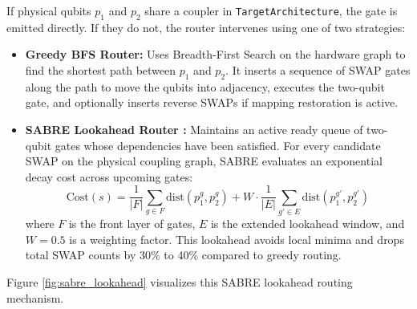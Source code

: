 If physical qubits $p_1$ and $p_2$ share a coupler in \texttt{TargetArchitecture}, the gate is emitted directly. If they do not, the router intervenes using one of two strategies:
\begin{itemize}[leftmargin=*]
    \item \textbf{Greedy BFS Router:} Uses Breadth-First Search on the hardware graph to find the shortest path between $p_1$ and $p_2$. It inserts a sequence of SWAP gates along the path to move the qubits into adjacency, executes the two-qubit gate, and optionally inserts reverse SWAPs if mapping restoration is active.
    \item \textbf{SABRE Lookahead Router \cite{li2019sabre}:} Maintains an active ready queue of two-qubit gates whose dependencies have been satisfied. For every candidate SWAP on the physical coupling graph, SABRE evaluates an exponential decay cost across upcoming gates:
    \begin{equation}
    \text{Cost}(s) = \frac{1}{|F|} \sum_{g \in F} \text{dist}(p_1^g, p_2^g) + W \cdot \frac{1}{|E|} \sum_{g' \in E} \text{dist}(p_1^{g'}, p_2^{g'})
    \end{equation}
    where $F$ is the front layer of gates, $E$ is the extended lookahead window, and $W = 0.5$ is a weighting factor. This lookahead avoids local minima and drops total SWAP counts by 30\% to 40\% compared to greedy routing.
\end{itemize}

Figure \ref{fig:sabre_lookahead} visualizes this SABRE lookahead routing mechanism.

